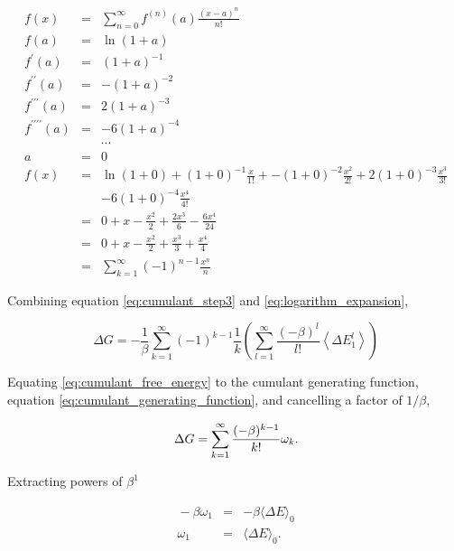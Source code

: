 \begin{eqnarray}
\ f(x) &=& \sum_{n=0}^{\infty} f^{(n)}(a) \frac{(x-a)^n}{n!} \\
\ f(a) &=& \ln (1+a) \nonumber \\
\ f^{\prime} (a) &=& (1+a)^{-1} \nonumber \\
\ f^{\prime\prime} (a) &=& -(1+a)^{-2} \nonumber \\
\ f^{\prime\prime\prime} (a) &=& 2(1+a)^{-3} \nonumber \\
\ f^{\prime\prime\prime\prime} (a) &=& -6(1+a)^{-4} \nonumber \\
\ & & \cdots \nonumber \\
\ a &=& 0 \nonumber \\
\ f(x) &=& \ln (1+0) + (1+0)^{-1} \frac{x}{1!} + -(1+0)^{-2} \frac{x^2}{2!}+2(1+0)^{-3}\frac{x^3}{3!} \nonumber \\
& & - 6(1+0)^{-4} \frac{x^4}{4!} \\
\ &=& 0 + x - \frac{x^2}{2} + \frac{2x^3}{6} - \frac{6x^4}{24} \\
\ &=& 0 + x - \frac{x^2}{2} + \frac{x^3}{3} + \frac{x^4}{4} \\
\ &=& \sum_{k=1}^{\infty} (-1)^{n-1} \frac{x^n}{n} \label{eq:logarithm_expansion}
\end{eqnarray}

Combining equation \ref{eq:cumulant_step3} and \ref{eq:logarithm_expansion},

\begin{equation} \label{eq:cumulant_free_energy}
\ \Delta G = - \frac{1}{\beta} \sum_{k=1}^{\infty} (-1)^{k-1} \frac{1}{k} \left( \sum_{l=1}^{\infty} \frac{(-\beta)^l}{l!} \left\langle \Delta E_1^l \right\rangle \right)
\end{equation}

Equating \ref{eq:cumulant_free_energy} to the cumulant generating function, equation \ref{eq:cumulant_generating_function}, and cancelling a factor of $1/\beta$,

\begin{equation} \label{eq:cumulant_generating_function}
\ \Delta G = \sum_{k=1}^{\infty} \frac{(-\beta)^{k-1}}{k!} \omega_k \\.
\end{equation}

Extracting powers of $\beta^1$

\begin{eqnarray}
\ -\beta \omega_1 &=& - \beta \langle \Delta E \rangle_0 \nonumber \\
\ \omega_1 &=& \langle \Delta E \rangle_0 .
\end{eqnarray}

